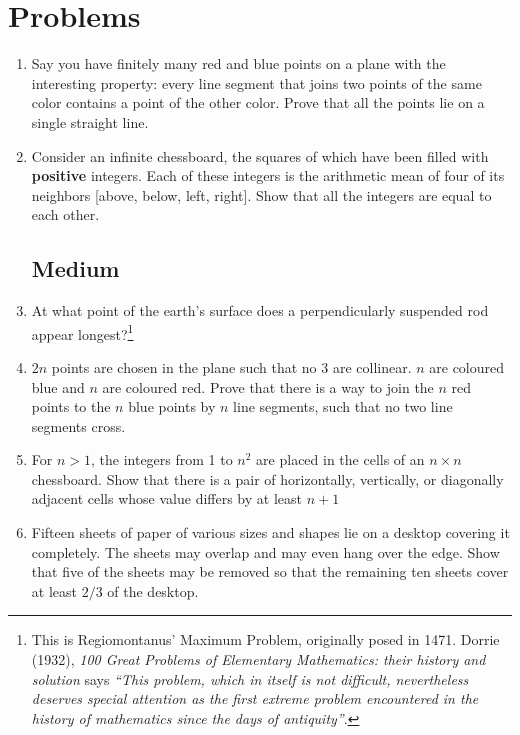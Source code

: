 \documentclass[12pt]{article}
\begin{document}
\section{Problems}

\begin{enumerate}
	\subsection*{Easy}
	\item{Say you have finitely many red and blue points on a plane with the interesting property: every line segment that joins two points of the same color contains a point of the other color. Prove that all the points lie on a single straight line.}
	
	\item{Consider an infinite chessboard, the squares of which have been filled with \textbf{positive} integers. Each of these integers is the arithmetic mean of four of its neighbors [above, below, left, right]. Show that all the integers are equal to each other.}
	
	\subsection*{Medium}
    \item{At what point of the earth's surface does a perpendicularly suspended rod appear longest?\footnote{This is Regiomontanus' Maximum Problem, originally posed in 1471. Dorrie (1932), {\em 100 Great Problems of Elementary Mathematics: their history and solution} says {\em ``This problem, which in itself is not difficult, nevertheless deserves special attention as the {\em first extreme problem} encountered in the history of mathematics since the days of antiquity''}. }}
	
    \item{$2n$ points are chosen in the plane such that no $3$ are collinear. $n$ are coloured blue and $n$ are coloured red. Prove that there is a way to join the $n$ red points to the $n$ blue points by $n$ line segments, such that no two line segments cross.}
	
	\item{For $n>1$, the integers from 1 to $n^2$ are placed in the cells of an $n\times n$ chessboard. Show that there is a pair of horizontally, vertically, or diagonally adjacent cells whose value differs by at least $n+1$}
	
	\item{Fifteen sheets of paper of various sizes and shapes lie on a desktop covering it completely. The sheets may overlap and may even hang over the edge. Show that five of the sheets may be removed so that the remaining ten sheets cover at least $2/3$ of the desktop.}
	

\end{enumerate}
\end{document}
